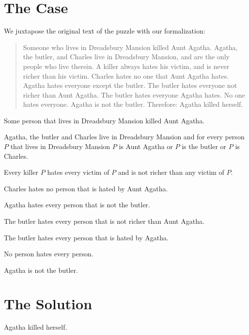 \documentclass{article}
\begin{document}
\section{The Case}

We juxtapose the original text of the puzzle with our formalization:

\begin{quotation}
  \noindent Someone who lives in Dreadsbury Mansion killed Aunt Agatha.
  Agatha, the butler, and Charles live in Dreadsbury Mansion, and are the only
  people who live therein.
  A killer always hates his victim, and is never richer than his victim.
  Charles hates no one that Aunt Agatha hates.
  Agatha hates everyone except the butler.
  The butler hates everyone not richer than Aunt Agatha.
  The butler hates everyone Agatha hates.
  No one hates everyone.
  Agatha is not the butler.
  Therefore: Agatha killed herself.
\end{quotation}


\begin{forthel}
  \begin{axiom}
    Some person that lives in Dreadsbury Mansion killed Aunt Agatha.
  \end{axiom}
  \begin{axiom}
    Agatha, the butler and Charles live in Dreadsbury Mansion and for every person $P$ that lives in Dreadsbury Mansion $P$ is Aunt Agatha or $P$ is the butler or $P$ is Charles.
  \end{axiom}
  \begin{axiom}
    Every killer $P$ hates every victim of $P$ and is not richer than any victim of $P$.
  \end{axiom}
  \begin{axiom}
    Charles hates no person that is hated by Aunt Agatha.
  \end{axiom}
  \begin{axiom}
    Agatha hates every person that is not the butler.
  \end{axiom}
  \begin{axiom}
    The butler hates every person that is not richer than Aunt Agatha.
  \end{axiom}
  \begin{axiom}
    The butler hates every person that is hated by Agatha.
  \end{axiom}
  \begin{axiom}
    No person hates every person.
  \end{axiom}
  \begin{axiom}
    Agatha is not the butler.
  \end{axiom}
\end{forthel}


\section{The Solution}

\begin{forthel}
  \begin{theorem}
    Agatha killed herself.
  \end{theorem}
\end{forthel}

\printbibliography
\end{document}
